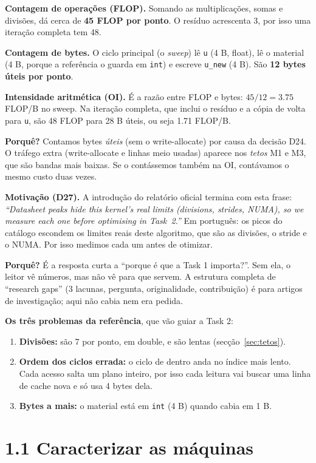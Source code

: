 \documentclass[11pt,a4paper]{article}
\newcommand{\porque}[1]{\par\noindent\colorbox{blue!6}{\parbox{\dimexpr\linewidth-2\fboxsep}{\small\textbf{Porquê?} #1}}\par}
\begin{document}
\textbf{Contagem de operações (FLOP).} Somando as multiplicações, somas e divisões, dá cerca de
\textbf{45 FLOP por ponto}. O resíduo acrescenta 3, por isso uma iteração completa tem 48.

\textbf{Contagem de bytes.} O ciclo principal (o \emph{sweep}) lê \texttt{u} (4 B, float), lê o material
(4 B, porque a referência o guarda em \texttt{int}) e escreve \texttt{u\_new} (4 B). São
\textbf{12 bytes úteis por ponto}.

\textbf{Intensidade aritmética (OI).} É a razão entre FLOP e bytes: $45/12 = 3.75$ FLOP/B no sweep. Na
iteração completa, que inclui o resíduo e a cópia de volta para \texttt{u}, são 48 FLOP para 28 B úteis,
ou seja 1.71 FLOP/B.

\porque{Contamos bytes \emph{úteis} (sem o write-allocate) por causa da decisão D24. O tráfego extra
(write-allocate e linhas meio usadas) aparece nos \emph{tetos} M1 e M3, que são bandas mais baixas.
Se o contássemos também na OI, contávamos o mesmo custo duas vezes.}

\textbf{Motivação (D27).} A introdução do relatório oficial termina com esta frase: \emph{``Datasheet
peaks hide this kernel's real limits (divisions, strides, NUMA), so we measure each one before optimising
in Task~2.''} Em português: os picos do catálogo escondem os limites reais deste algoritmo, que são as
divisões, o stride e o NUMA. Por isso medimos cada um antes de otimizar.
\porque{É a resposta curta a ``porque é que a Task 1 importa?''. Sem ela, o leitor vê números, mas não vê
para que servem. A estrutura completa de ``research gaps'' (3 lacunas, pergunta, originalidade,
contribuição) é para artigos de investigação; aqui não cabia nem era pedida.}

\textbf{Os três problemas da referência}, que vão guiar a Task 2:
\begin{enumerate}
\item \textbf{Divisões:} são 7 por ponto, em double, e são lentas (secção~\ref{sec:tetos}).
\item \textbf{Ordem dos ciclos errada:} o ciclo de dentro anda no índice mais lento. Cada acesso salta um
plano inteiro, por isso cada leitura vai buscar uma linha de cache nova e só usa 4 bytes dela.
\item \textbf{Bytes a mais:} o material está em \texttt{int} (4 B) quando cabia em 1 B.
\end{enumerate}

\section{1.1 Caracterizar as máquinas}
\end{document}
